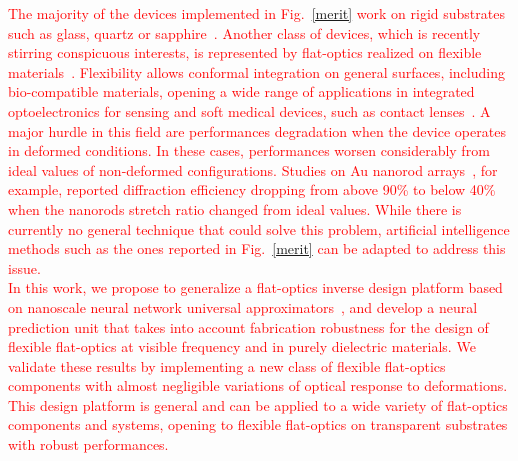 \documentclass[two-columns]{nature}
\newcommand{\rev}[1]{\textcolor{red}{#1}}
\begin{document}
\rev{The majority of the devices implemented in Fig.~\ref{merit} work on rigid substrates such as glass,
quartz or sapphire~\cite{yu2014flat,StanislavB.Glybovski2016}. Another class of devices, which is recently stirring conspicuous interests, is represented by flat-optics realized on flexible materials~\cite{Walia2015,Chen2020,Burch2017,Burch2019}. Flexibility allows conformal integration on general surfaces, including bio-compatible materials, opening a wide range of applications in integrated optoelectronics for sensing and soft
medical devices, such as contact lenses~\cite{Xu2011,Hokari2018,Karepov2020,DiFalco2010}. A major hurdle in this field are performances degradation when the device operates in deformed conditions. In these cases, performances worsen considerably from ideal values of non-deformed configurations. Studies on Au nanorod arrays~\cite{ee2016tunable}, for example, reported diffraction efficiency dropping from above 90\% to below 40\% when the nanorods stretch ratio changed from ideal values. While there is currently no general technique that could solve this problem, artificial intelligence methods such as the ones reported in Fig.~\ref{merit} can be adapted to address this issue.\\ In this work, we propose to generalize a flat-optics inverse design platform based on nanoscale neural network universal approximators~\cite{makarenko2020generalized,getman2020broadband}, and develop a neural prediction unit that takes into account fabrication robustness for the design of flexible flat-optics at visible frequency and in purely dielectric materials. We validate these results by implementing a new class of flexible flat-optics components with almost negligible variations of optical response to deformations. This design platform is general and can be applied to a wide variety of flat-optics components and systems, opening to flexible flat-optics on transparent substrates with robust performances.}


\printbibliography
\clearpage
\end{document}
